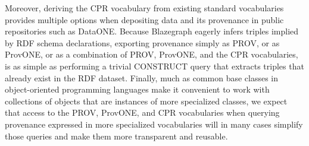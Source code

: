 Moreover, deriving the CPR vocabulary from existing standard vocabularies provides multiple options when depositing data and its provenance in public repositories such as DataONE. Because Blazegraph eagerly infers triples implied by RDF schema declarations, exporting provenance simply as PROV, or as ProvONE, or as a combination of PROV, ProvONE, and the CPR vocabularies, is as simple as performing a trivial CONSTRUCT query that extracts triples that already exist in the RDF dataset. Finally, much as common base classes in object-oriented programming languages make it convenient to work with collections of objects that are instances of more specialized classes, we expect that access to the PROV, ProvONE, and CPR vocabularies when querying provenance expressed in more specialized vocabularies will in many cases simplify those queries and make them more transparent and reusable.



